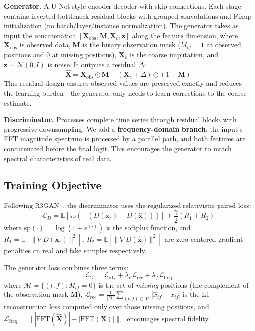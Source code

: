 \documentclass[sigconf,nonacm]{acmart}
\begin{document}
\textbf{Generator.}
A U-Net-style encoder-decoder with skip connections. Each stage contains inverted-bottleneck residual blocks with grouped convolutions and Fixup initialization (no batch/layer/instance normalization). The generator takes as input the concatenation $[\mathbf{X}_{\text{obs}}, \mathbf{M}, \mathbf{X}_c, \mathbf{z}]$ along the feature dimension, where $\mathbf{X}_{\text{obs}}$ is observed data, $\mathbf{M}$ is the binary observation mask ($M_{tf}=1$ at observed positions and $0$ at missing positions), $\mathbf{X}_c$ is the coarse imputation, and $\mathbf{z} \sim \mathcal{N}(0, I)$ is noise. It outputs a residual $\Delta$:
\begin{equation}
    \hat{\mathbf{X}} = \mathbf{X}_{\text{obs}} \odot \mathbf{M} + (\mathbf{X}_c + \Delta) \odot (1 - \mathbf{M})
\end{equation}
This residual design ensures observed values are preserved exactly and reduces the learning burden---the generator only needs to learn corrections to the coarse estimate.

\textbf{Discriminator.}
Processes complete time series through residual blocks with progressive downsampling. We add a \textbf{frequency-domain branch}: the input's FFT magnitude spectrum is processed by a parallel path, and both features are concatenated before the final logit. This encourages the generator to match spectral characteristics of real data.

\subsection{Training Objective}

Following R3GAN~\citep{huang2024r3gan}, the discriminator uses the regularized relativistic paired loss:
\begin{equation}
    \mathcal{L}_D = \mathbb{E}[\text{sp}(-(D(\mathbf{x}_r) - D(\hat{\mathbf{x}})))] + \frac{\gamma}{2}(R_1 + R_2)
\end{equation}
where $\text{sp}(\cdot) = \log(1 + e^{(\cdot)})$ is the softplus function, and $R_1 = \mathbb{E}[\|\nabla D(\mathbf{x}_r)\|^2]$, $R_2 = \mathbb{E}[\|\nabla D(\hat{\mathbf{x}})\|^2]$ are zero-centered gradient penalties on real and fake samples respectively.

The generator loss combines three terms:
\begin{equation}
    \mathcal{L}_G = \mathcal{L}_{\text{adv}} + \lambda_r \mathcal{L}_{\text{rec}} + \lambda_f \mathcal{L}_{\text{freq}}
\end{equation}
where $\mathcal{M} = \{(t,f) : M_{tf}=0\}$ is the set of \emph{missing} positions (the complement of the observation mask $\mathbf{M}$), $\mathcal{L}_{\text{rec}} = \frac{1}{|\mathcal{M}|}\sum_{(t,f) \in \mathcal{M}} |\hat{x}_{tf} - x_{tf}|$ is the L1 reconstruction loss computed only over those missing positions, and $\mathcal{L}_{\text{freq}} = \||\text{FFT}(\hat{\mathbf{X}})| - |\text{FFT}(\mathbf{X})|\|_1$ encourages spectral fidelity.
\end{document}
